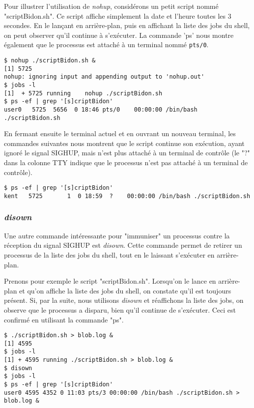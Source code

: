 Pour illustrer l'utilisation de \textit{nohup}, considérons un petit script nommé "scriptBidon.sh". Ce script affiche simplement la date et l'heure toutes les 3 secondes. En le lançant en arrière-plan, puis 
en affichant la liste des jobs du shell, on peut observer qu'il continue à s'exécuter. La commande 'ps' nous montre également que le processus est attaché à un terminal nommé \texttt{pts/0}.

\begin{lstlisting}[style=blackstyle]
$ nohup ./scriptBidon.sh &
[1] 5725
nohup: ignoring input and appending output to 'nohup.out'                              
$ jobs -l
[1]  + 5725 running    nohup ./scriptBidon.sh
$ ps -ef | grep '[s]criptBidon'
user0   5725  5656  0 18:46 pts/0    00:00:00 /bin/bash ./scriptBidon.sh
\end{lstlisting}

En fermant ensuite le terminal actuel et en ouvrant un nouveau terminal, les commandes suivantes nous montrent que le script continue son exécution, ayant ignoré le signal SIGHUP,
mais n'est plus attaché à un terminal de contrôle (le "?" dans la colonne TTY indique que le processus n'est pas attaché à un terminal de contrôle).

\begin{lstlisting}[style=blackstyle]
$ ps -ef | grep '[s]criptBidon'
kent   5725       1  0 18:59  ?    00:00:00 /bin/bash ./scriptBidon.sh
\end{lstlisting}

\subsubsection{\textit{disown}}

Une autre commande intéressante pour "immuniser" un processus contre la réception du signal SIGHUP est \textit{disown}. Cette commande permet de retirer un processus de la liste des jobs du shell,
tout en le laissant s'exécuter en arrière-plan.

Prenons pour exemple le script "scriptBidon.sh". Lorsqu'on le lance en arrière-plan et qu'on affiche la liste des jobs du shell, on constate qu'il est toujours présent. Si, par la suite,
nous utilisons \textit{disown} et réaffichons la liste des jobs, on observe que le processus a disparu, bien qu'il continue de s'exécuter. Ceci est confirmé en utilisant la commande "ps".

\begin{lstlisting}[style=blackstyle]
$ ./scriptBidon.sh > blob.log &
[1] 4595
$ jobs -l
[1] + 4595 running ./scriptBidon.sh > blob.log &
$ disown
$ jobs -l
$ ps -ef | grep '[s]criptBidon'
user0 4595 4352 0 11:03 pts/3 00:00:00 /bin/bash ./scriptBidon.sh > blob.log &
\end{lstlisting}


